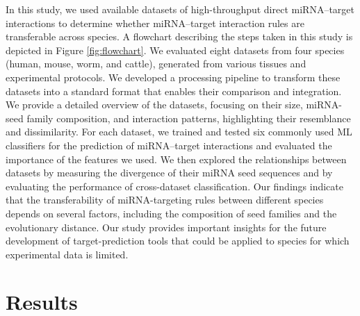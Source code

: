 \documentclass{bmcart}
\begin{document}
In this study, we used available datasets of high-throughput direct miRNA--target interactions to determine whether miRNA--target interaction rules are transferable across species. A flowchart describing the steps taken in this study is depicted in Figure \ref{fig:flowchart}. We evaluated eight datasets from four species (human, mouse, worm, and cattle), generated from various tissues and experimental protocols. We developed a processing pipeline to transform these datasets into a standard format that enables their comparison and integration. We provide a detailed overview of the datasets, focusing on their size, miRNA-seed family composition, and interaction patterns, highlighting their resemblance and dissimilarity. For each dataset, we trained and tested six commonly used ML classifiers for the prediction of miRNA--target interactions and evaluated the importance of the features we used.
We then explored the relationships between datasets by measuring the divergence of their miRNA seed sequences and by evaluating the performance of cross-dataset classification. Our findings indicate that the transferability of miRNA-targeting rules between different species depends on several factors, including the composition of seed families and the evolutionary distance. Our study provides important insights for the future development of target-prediction tools that could be applied to species for which experimental data is limited.



\clearpage
\section*{Results}
\end{document}
